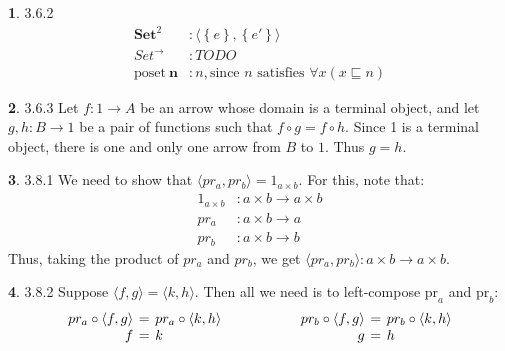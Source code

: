 \documentclass{article}
\theoremstyle{definition}
\newcommand{\set}[1]{\left\{#1\right\}}
\newcommand{\Set}{\mathbf{Set}}
\theoremstyle{definition}
\theoremstyle{definition}
\newtheorem{solution-internal}{}[subsection]
\newenvironment{solution}{
  \begin{solution-internal}
}{
  \end{solution-internal}
}
\begin{document}
\begin{solution}
  3.6.2 
  \begin{align*}
    \Set^2 &: \langle \set{e}, \set{e'} \rangle \\
    Set^{\rightarrow} &: TODO \\
    \text{poset}~\mathbf{n} &: n, \text{since $n$ satisfies $\forall x (x \sqsubseteq n)$}
  \end{align*}
\end{solution}

\begin{solution}
  3.6.3 Let $f\colon 1 \to A$ be an arrow whose domain is a terminal object, and
  let $g, h \colon B \to 1$ be a pair of functions such that $f \circ g = f
  \circ h$. Since 1 is a terminal object, there is one and only one arrow from
  $B$ to $1$. Thus $g = h$.
\end{solution}

\begin{solution}
  3.8.1 We need to show that $\langle pr_a, pr_b \rangle = 1_{a \times b}$. For
  this, note that:
  \begin{align*}
    1_{a \times b} &\colon a \times b \to a \times b \\
    pr_a           &\colon a \times b \to a \\
    pr_b           &\colon a \times b \to b
  \end{align*}
  Thus, taking the product of $pr_a$ and $pr_b$, we get $\langle pr_a, pr_b
  \rangle \colon a \times b \to a \times b$.

  \begin{center}
  \end{center}

\end{solution}

\begin{solution}
  3.8.2 Suppose $\langle f, g \rangle = \langle k, h \rangle$. Then all we need
  is to left-compose $\text{pr}_a$ and $\text{pr}_b$:
  \[
    \arraycolsep=2pt
    \begin{array}{rcl @{\hspace{2cm}} rcl}
    pr_a \circ \langle f,g\rangle &=& pr_a \circ \langle k,h\rangle & pr_b \circ
    \langle f,g\rangle &=& pr_b \circ \langle k,h\rangle \\
    f &=& k & g &=& h
  \end{array}
  \]
\end{solution}
\end{document}
